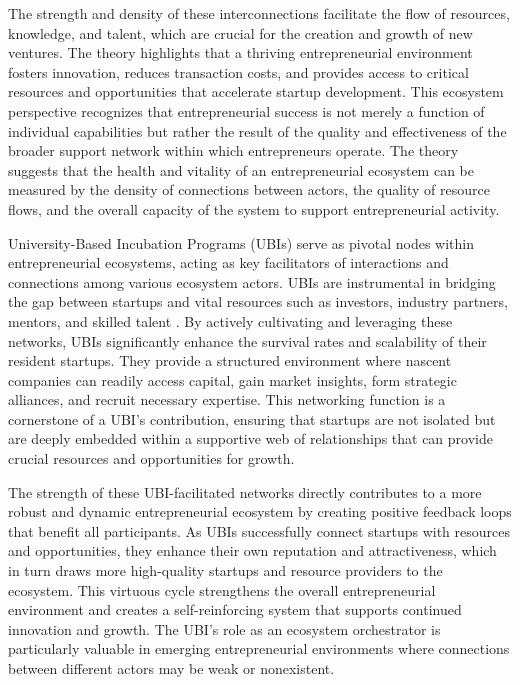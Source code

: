 \documentclass[../Main.tex]{subfiles}
\begin{document}
The strength and density of these interconnections facilitate the flow of resources, knowledge, and talent, which are crucial for the creation and growth of new ventures. The theory highlights that a thriving entrepreneurial environment fosters innovation, reduces transaction costs, and provides access to critical resources and opportunities that accelerate startup development. This ecosystem perspective recognizes that entrepreneurial success is not merely a function of individual capabilities but rather the result of the quality and effectiveness of the broader support network within which entrepreneurs operate. The theory suggests that the health and vitality of an entrepreneurial ecosystem can be measured by the density of connections between actors, the quality of resource flows, and the overall capacity of the system to support entrepreneurial activity.

University-Based Incubation Programs (UBIs) serve as pivotal nodes within entrepreneurial ecosystems, acting as key facilitators of interactions and connections among various ecosystem actors. UBIs are instrumental in bridging the gap between startups and vital resources such as investors, industry partners, mentors, and skilled talent \autocite{theodorakopoulos2014business}. By actively cultivating and leveraging these networks, UBIs significantly enhance the survival rates and scalability of their resident startups. They provide a structured environment where nascent companies can readily access capital, gain market insights, form strategic alliances, and recruit necessary expertise. This networking function is a cornerstone of a UBI's contribution, ensuring that startups are not isolated but are deeply embedded within a supportive web of relationships that can provide crucial resources and opportunities for growth.

The strength of these UBI-facilitated networks directly contributes to a more robust and dynamic entrepreneurial ecosystem by creating positive feedback loops that benefit all participants. As UBIs successfully connect startups with resources and opportunities, they enhance their own reputation and attractiveness, which in turn draws more high-quality startups and resource providers to the ecosystem. This virtuous cycle strengthens the overall entrepreneurial environment and creates a self-reinforcing system that supports continued innovation and growth. The UBI's role as an ecosystem orchestrator is particularly valuable in emerging entrepreneurial environments where connections between different actors may be weak or nonexistent.
\end{document}
